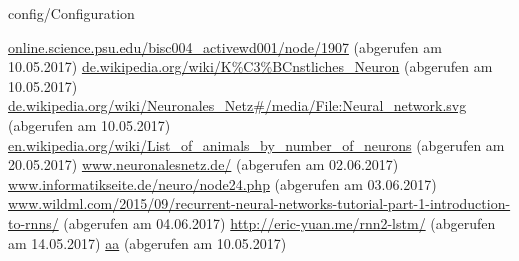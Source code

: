 \documentclass[12pt,headsepline,oneside,ngerman]{scrreprt}
\begin{document}
\graphicspath{{figures/}}

 {config/Configuration}
\pagestyle{headings}






%
%
%
%
%
%


%

\cleardoublepage
\begin{thebibliography}{xxxx}
\url{online.science.psu.edu/bisc004_activewd001/node/1907} (abgerufen am 10.05.2017)
\url{de.wikipedia.org/wiki/K%C3%BCnstliches_Neuron} (abgerufen am 10.05.2017)
\url{de.wikipedia.org/wiki/Neuronales_Netz#/media/File:Neural_network.svg} (abgerufen am 10.05.2017)
\url{en.wikipedia.org/wiki/List_of_animals_by_number_of_neurons} (abgerufen am 20.05.2017)
\url{www.neuronalesnetz.de/} (abgerufen am 02.06.2017)
\url{www.informatikseite.de/neuro/node24.php} (abgerufen am 03.06.2017)
\url{www.wildml.com/2015/09/recurrent-neural-networks-tutorial-part-1-introduction-to-rnns/} (abgerufen am 04.06.2017)
\url{http://eric-yuan.me/rnn2-lstm/} (abgerufen am 14.05.2017)
\url{aa} (abgerufen am 10.05.2017)


\end{thebibliography}
\renewcommand{\bibname}{Literaturverzeichnis}

%

\cleardoublepage
{}
\listoffigures
\end{document}
